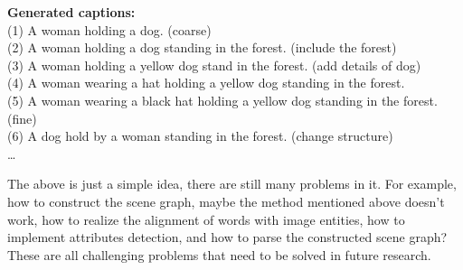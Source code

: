\documentclass[12pt]{article}
\begin{document}
	\textbf{Generated captions:}  \\
	(1)	A woman holding a dog.  							             \hfill (coarse)  \\
	(2)	A woman holding a dog standing in the forest. 		 	    \hfill (include the forest) \\
	(3)	A woman holding a yellow dog stand in the forest.		\hfill  	(add details of dog)  \\
	(4)	A woman wearing a hat holding a yellow dog standing in the forest.                \\
	(5)	A woman wearing a black hat holding a yellow dog standing in the forest.	\hfill (fine)  \\
	(6)	A dog hold by a woman standing in the forest.     \hfill 	    (change structure)         \\
	…  \par
	The above is just a simple idea, there are still many problems in it. For example, how to construct the scene graph, maybe the method mentioned above doesn’t work, how to realize the alignment of words with image entities, how to implement attributes detection, and how to parse the constructed scene graph? These are all challenging problems that need to be solved in future research.
	
\end{document}
